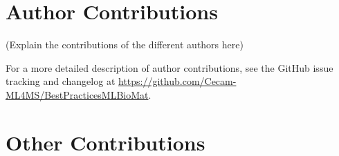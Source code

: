 \documentclass[9pt,bestpractices]{livecoms}
\newcommand{\githubrepository}{\url{https://github.com/Cecam-ML4MS/BestPracticesMLBioMat}}  %
\begin{document}

\section*{Author Contributions}
%

(Explain the contributions of the different authors here)

For a more detailed description of author contributions,
see the GitHub issue tracking and changelog at \githubrepository.

\section*{Other Contributions}
%
\end{document}
